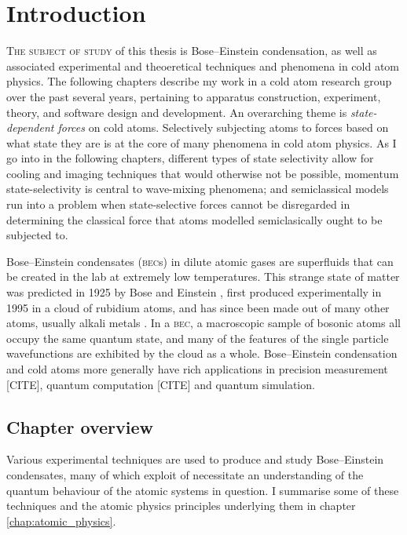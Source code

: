 \chapter{Introduction}\label{chap:introduction}

\lettrine[lines=3]{T}{he subject of study} of this thesis is Bose--Einstein condensation, as well as associated experimental and theoeretical techniques and phenomena in cold atom physics. The following chapters describe my work in a cold atom research group over the past several years, pertaining to apparatus construction, experiment, theory, and software design and development. An overarching theme is \emph{state-dependent forces} on cold atoms. Selectively subjecting atoms to forces based on what state they are is at the core of many phenomena in cold atom physics. As I go into in the following chapters, different types of state selectivity allow for cooling and imaging techniques that would otherwise not be possible, momentum state-selectivity is central to wave-mixing phenomena; and semiclassical models run into a problem when state-selective forces cannot be disregarded in determining the classical force that atoms modelled semiclasically ought to be subjected to.

Bose--Einstein condensates (\textsc{bec}s) in dilute atomic gases are superfluids that can be created in the lab at extremely low temperatures. This strange state of matter was predicted in 1925 by Bose and Einstein \cite{bose_plancks_1924, einstein_quantentheorie_1925} , first produced experimentally in 1995 \cite{anderson_observation_1995} in a cloud of rubidium atoms, and has since been made out of many other atoms, usually alkali metals \cite{davis_bose-einstein_1995, modugno_bose-einstein_2001, bradley_bose-einstein_1997, weber_bose-einstein_2003}. In a \textsc{bec}, a macroscopic sample of bosonic atoms all occupy the same quantum state, and many of the features of the single particle wavefunctions are exhibited by the cloud as a whole. Bose--Einstein condensation and cold atoms more generally have rich applications in precision measurement [CITE], quantum computation [CITE] and quantum simulation.  

\section{Chapter overview}

Various experimental techniques are used to produce and study Bose--Einstein condensates, many of which exploit of necessitate an understanding of the quantum behaviour of the atomic systems in question. I summarise some of these techniques and the atomic physics principles underlying them in chapter \ref{chap:atomic_physics}.

